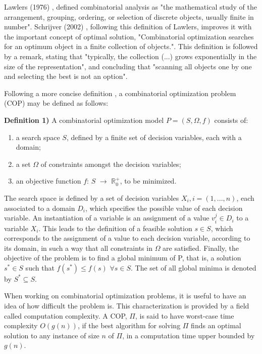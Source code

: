 
Lawlers (1976) \cite{COP_book_lawler}, defined combinatorial analysis as "the mathematical study of the arrangement, grouping, ordering, or selection of discrete objects, usually finite in number". Schrijver (2002) \cite{COP_book}, following this definition of Lawlers, improves it with the important concept of optimal solution, "Combinatorial optimization searches for an optimum object in a finite collection of objects.". This definition is followed by a remark, stating that "typically, the collection (...) grows exponentially in the size of the representation", and concluding that "scanning all objects one by one and selecting the best is not an option".

Following a more concise definition \cite{aco_overview_advances}, a combinatorial optimization problem (COP) may be defined as follows:

\textbf{Definition 1)}  A combinatorial optimization model $P = (S,\Omega, f)$ consists of:
\begin{enumerate}
  \item a search space $S$, defined by a finite set of decision variables, each with a domain;
  \item a set $\Omega$ of constraints amongst the decision variables;
  \item an objective function $f$: $S$ $\rightarrow$ $\mathbb{R}_{0}^{+}$, to be minimized.
\end{enumerate}

The search space is defined by a set of decision variables $X_{i}, i = (1,...,n)$, each associated to a domain $D_{i}$, which specifies the possible value of each decision variable. An instantiation of a variable is an assignment of a value $v_{i}^{j} \in D_{i}$ to a variable $X_{i}$. This leads to the definition of a feasible solution $s \in S$, which corresponds to the assignment of a value to each decision variable, according to its domain, in such a way that all constraints in $\Omega$ are satisfied. Finally, the objective of the problem is to find a global minimum of P, that is, a solution $s^{*} \in S$ such that $f(s^{*}) \leq f(s)$ $\forall s \in S$. The set of all global minima is denoted by $S^{*} \subseteq S$.

When working on combinatorial optimization problems, it is useful to have an idea of how difficult the problem is. This characterization is provided by a field called computation complexity. A COP, $\Pi$, is said to have worst-case time complexity  $O(g(n))$, if the best algorithm 
for solving $\Pi$ finds an optimal solution to any instance of size $n$ of $\Pi$,
in a computation time upper bounded by $g(n)$.

